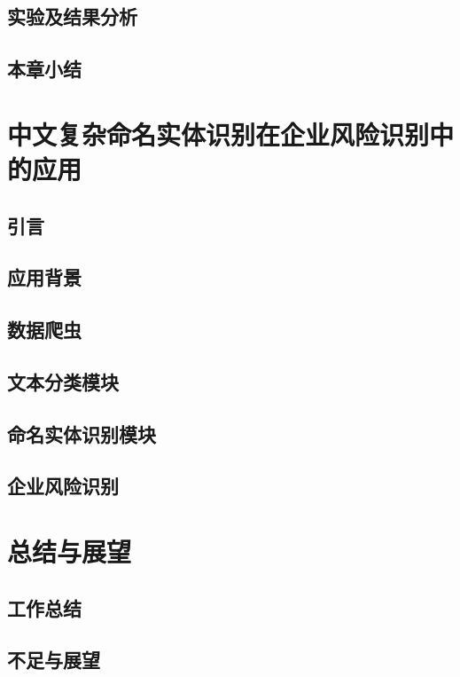 \documentclass[winfonts,master,oneside,nobackinfo]{njuthesis}
\begin{document}
\section{实验及结果分析}

\section{本章小结}

\chapter{中文复杂命名实体识别在企业风险识别中的应用}

\section{引言}

\section{应用背景}

\section{数据爬虫}

\section{文本分类模块}

\section{命名实体识别模块}

\section{企业风险识别}

\chapter{总结与展望}

\section{工作总结}

\section{不足与展望}
\end{document}
